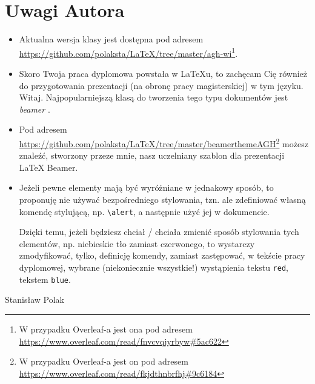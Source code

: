 \chapter{Uwagi Autora}
\begin{itemize}
     \item Aktualna wersja klasy jest dostępna pod adresem \url{https://github.com/polaksta/LaTeX/tree/master/agh-wi}\footnote{W przypadku Overleaf-a jest ona pod adresem  \url{https://www.overleaf.com/read/fnvcvqjyrbyw\#5ac622}}.
    \item Skoro Twoja praca dyplomowa powstała w \LaTeX{}u, to zachęcam Cię również do przygotowania prezentacji (na obronę pracy magisterskiej) w tym języku. Witaj. Najpopularniejszą klasą do tworzenia tego typu dokumentów jest \emph{beamer} \cite{beamer}.
    \item Pod adresem \url{https://github.com/polaksta/LaTeX/tree/master/beamerthemeAGH}\footnote{W przypadku Overleaf-a jest on pod adresem  \url{https://www.overleaf.com/read/fkjdthnbrfhj\#9c6184}} możesz znaleźć, stworzony przeze mnie,  nasz uczelniany szablon dla prezentacji \LaTeX{} Beamer.
    \item Jeżeli pewne elementy mają być wyróżniane w \alert{jednakowy} \alert{sposób}, to proponuję nie używać bezpośredniego stylowania, tzn.
           ale zdefiniować własną komendę stylującą, np. \verb+\alert+,
          a następnie użyć jej w dokumencie.

          Dzięki temu, jeżeli będziesz chciał / chciała zmienić sposób stylowania tych elementów, np. niebieskie tło zamiast czerwonego, to wystarczy zmodyfikować, tylko, definicję komendy, zamiast zastępować, w tekście pracy dyplomowej, wybrane (niekoniecznie wszystkie!) wystąpienia tekstu \texttt{red}, tekstem \texttt{blue}.
\end{itemize}
Stanisław Polak

